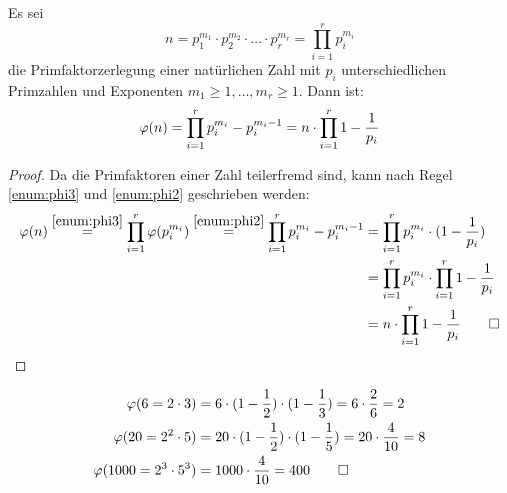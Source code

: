 \begin{satz}
  Es sei
  \begin{equation*}
    n = p_1^{m_1} \cdot p_2^{m_2} \cdot \ldots \cdot p_r^{m_r} = \prod_{i=1}^{r} p_i^{m_i}
  \end{equation*}
  die Primfaktorzerlegung einer natürlichen Zahl mit $p_i$ unterschiedlichen Primzahlen
  und Exponenten $m_1 \geq 1,\ldots, m_r \geq 1$. Dann ist:
  \begin{equation*}
    \varphi(n) = \prod_{i=1}^{r} p_i^{m_i} - p_i^{m_i - 1} =
    n \cdot \prod_{i=1}^{r} 1 - \frac{1}{p_i}
  \end{equation*}
\end{satz}

\begin{proof}
  Da die Primfaktoren einer Zahl teilerfremd sind, kann nach Regel \ref{enum:phi3}
  und \ref{enum:phi2} geschrieben werden:
  \begin{align*}
    \varphi(n) \stackrel{\ref{enum:phi3}}{=} \prod_{i=1}^{r} \varphi(p_i^{m_i})
    \stackrel{\ref{enum:phi2}}{=} \prod_{i=1}^{r} p_i^{m_i} - p_i^{m_i - 1}
     & = \prod_{i=1}^{r} p_i^{m_i} \cdot (1 - \frac{1}{p_i})               \\
     & = \prod_{i=1}^{r} p_i^{m_i} \cdot \prod_{i=1}^{r} 1 - \frac{1}{p_i} \\
     & = n \cdot \prod_{i=1}^{r} 1 - \frac{1}{p_i} \qedhere
  \end{align*}
\end{proof}

\begin{example}
  \begin{align*}
    \varphi(6 = 2 \cdot 3)        & = 6 \cdot (1 - \frac{1}{2}) \cdot (1 - \frac{1}{3}) =
    6 \cdot \frac{2}{6} = 2                                                              \\
    \varphi(20 = 2^2 \cdot 5)     & = 20 \cdot (1 - \frac{1}{2}) \cdot (1 - \frac{1}{5}) =
    20 \cdot \frac{4}{10} = 8                                                            \\
    \varphi(1000 = 2^3 \cdot 5^3) & = 1000 \cdot \frac{4}{10} = 400 \qedhere
  \end{align*}
\end{example}